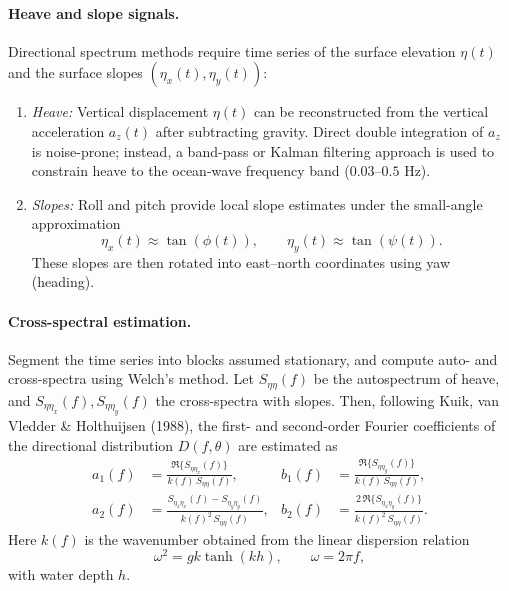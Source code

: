 \documentclass[11pt]{article}
\begin{document}
\paragraph{Heave and slope signals.}
Directional spectrum methods require time series of the surface elevation $\eta(t)$ and the surface slopes $(\eta_x(t),\eta_y(t))$:
\begin{enumerate}
  \item \emph{Heave:} Vertical displacement $\eta(t)$ can be reconstructed from the vertical acceleration $a_z(t)$ after subtracting gravity. Direct double integration of $a_z$ is noise-prone; instead, a band-pass or Kalman filtering approach is used to constrain heave to the ocean-wave frequency band ($0.03$--$0.5$ Hz).
  \item \emph{Slopes:} Roll and pitch provide local slope estimates under the small-angle approximation
  \begin{equation}
  \eta_x(t) \approx \tan(\phi(t)), \qquad \eta_y(t) \approx \tan(\psi(t)).
  \end{equation}
  These slopes are then rotated into east--north coordinates using yaw (heading).
\end{enumerate}

\paragraph{Cross-spectral estimation.}
Segment the time series into blocks assumed stationary, and compute auto- and cross-spectra using Welch's method. Let $S_{\eta\eta}(f)$ be the autospectrum of heave, and $S_{\eta\eta_x}(f), S_{\eta\eta_y}(f)$ the cross-spectra with slopes. Then, following Kuik, van Vledder \& Holthuijsen (1988), the first- and second-order Fourier coefficients of the directional distribution $D(f,\theta)$ are estimated as
\begin{align}
a_1(f) &= \frac{\Re\{S_{\eta\eta_x}(f)\}}{k(f)\,S_{\eta\eta}(f)}, 
& b_1(f) &= \frac{\Re\{S_{\eta\eta_y}(f)\}}{k(f)\,S_{\eta\eta}(f)}, \\
a_2(f) &= \frac{S_{\eta_x\eta_x}(f) - S_{\eta_y\eta_y}(f)}{k(f)^2\,S_{\eta\eta}(f)}, 
& b_2(f) &= \frac{2\,\Re\{S_{\eta_x\eta_y}(f)\}}{k(f)^2\,S_{\eta\eta}(f)}.
\end{align}
Here $k(f)$ is the wavenumber obtained from the linear dispersion relation
\begin{equation}
\omega^2 = gk \tanh(kh), \qquad \omega=2\pi f,
\end{equation}
with water depth $h$.
\end{document}
